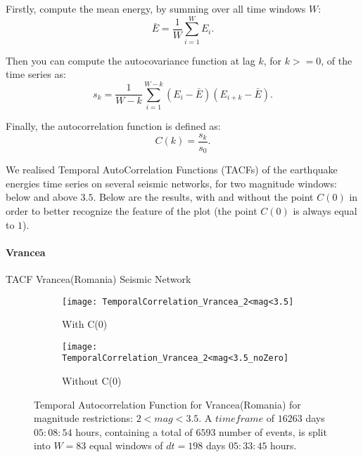 Firstly, compute the mean energy, by summing over all time windows $W$:
\begin{equation}
\bar{E} = \frac{1}{W}\sum_{i=1}^{W}E_i.
\end{equation}

Then you can compute the autocovariance function at lag $k$, for $k>=0$, of the time series as:
\begin{equation}
s_k = \frac{1}{W-k}\sum_{i=1}^{W-k} (E_i-\bar{E})(E_{i+k}-\bar{E}).
\end{equation}

Finally, the autocorrelation function is defined as:
\begin{equation}
C(k) = \frac{s_k}{s_0}.
\end{equation}

We realised Temporal AutoCorrelation Functions (TACFs) of the earthquake energies time series on several seismic networks, for two magnitude windows: below and above $3.5$. Below are the results, with and without the point $C(0)$ in order to better recognize the feature of the plot (the point $C(0)$ is always equal to $1$).


\paragraph{Vrancea} TACF Vrancea(Romania) Seismic Network

\begin{figure}[!ht]
\begin{subfigure}{.5\textwidth}
  \centering
  \texttt{[image: TemporalCorrelation\_Vrancea\_2<mag<3.5]}
  \caption{With C(0)}
  \label{fig:corrVrancea2_3.5}
\end{subfigure}%
\begin{subfigure}{.5\textwidth}
  \centering
  \texttt{[image: TemporalCorrelation\_Vrancea\_2<mag<3.5\_noZero]}
  \caption{Without C(0)}
  \label{fig:corrVrancea2_3.5_noZero}
\end{subfigure}
\caption{Temporal Autocorrelation Function for Vrancea(Romania) for magnitude restrictions: $2<mag<3.5$. A $timeframe$ of $16263$ days $05:08:54$ hours, containing a total of $6593$ number of events, is split into $W=83$ equal windows of $dt=198$ days $05:33:45$ hours.}
\label{fig:corrVrancea2_3.5!}
\end{figure}

